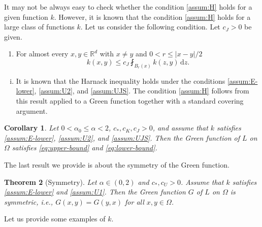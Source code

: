 \documentclass[reqno]{amsart}
\makeatletter
\newcommand{\mylabel}[2]{(#2)\def\@currentlabel{#2}\label{#1}}
\theoremstyle{plain}
\newtheorem{theorem}{Theorem}[section]
\newtheorem{corollary}[theorem]{Corollary}
\theoremstyle{definition}
\numberwithin{equation}{section}
\newcommand{\Rd}{\mathbb{R}^d}
\renewcommand{\d}{\mathrm{d}}
\newcommand{\cl} {c_{\ast}}
\newcommand{\cU} {c_U}
\newcommand{\cK} {c_K}
\newcommand{\cJ} {c_J}
\makeatother
\begin{document}
It may not be always easy to check whether the condition \eqref{assum:H} holds for a given function $k$. However, it is known that the condition \eqref{assum:H} holds for a large class of functions $k$. Let us consider the following condition. Let $\cJ > 0$ be given.
\begin{enumerate}
\item [\mylabel{assum:UJS}{UJS}]
For almost every $x, y \in \Rd$ with $x\neq y$ and $0 < r \leq |x-y|/2$
\begin{equation*}
k(x,y) \leq \cJ \fint_{B_r(x)} k(z, y) \,\d z.
\end{equation*}
\end{enumerate}

\begin{enumerate}[(i)]
\item[(iii)]
It is known \cite[Theorem 11.14]{Sch20} that the Harnack inequality holds under the conditions \eqref{assum:E-lower}, \eqref{assum:U2}, and \eqref{assum:UJS}. The condition \eqref{assum:H} follows from this result applied to a Green function together with a standard covering argument.
\end{enumerate}

\begin{corollary} \label{cor:bounds}
Let $0 < \alpha_0 \leq \alpha < 2$, $\cl, \cK, \cJ > 0$, and assume that $k$ satisfies \eqref{assum:E-lower}, \eqref{assum:U2}, and \eqref{assum:UJS}. Then the Green function of $L$ on $\Omega$ satisfies \eqref{eq:upper-bound} and \eqref{eq:lower-bound}.
\end{corollary}

The last result we provide is  about the symmetry of the Green function.

\begin{theorem} [Symmetry] \label{thm:symm}
Let $\alpha \in (0,2)$ and $\cl, \cU > 0$. Assume that $k$ satisfies \eqref{assum:E-lower} and \eqref{assum:U1}. Then the Green function $G$ of $L$ on $\Omega$ is symmetric, i.e., $G(x, y) = G(y, x)$ for all $x, y \in \Omega$.
\end{theorem}

Let us provide some examples of $k$.
\end{document}
